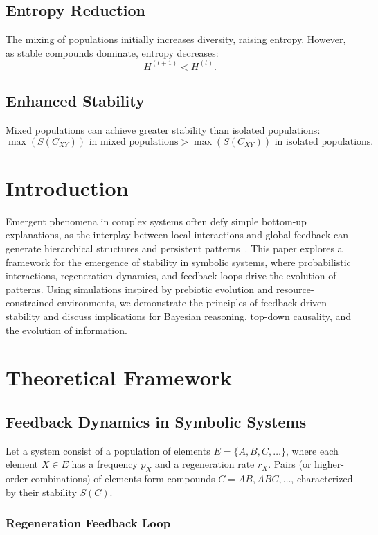 \documentclass[entropy,article,submit,pdftex,moreauthors]{Definitions/mdpi}
\begin{document}
\subsection*{Entropy Reduction}
The mixing of populations initially increases diversity, raising entropy. However, as stable compounds dominate, entropy decreases:
\[
H^{(t+1)} < H^{(t)}.
\]

\subsection*{Enhanced Stability}
Mixed populations can achieve greater stability than isolated populations:
\[
\max(S(C_{XY})) \text{ in mixed populations} > \max(S(C_{XY})) \text{ in isolated populations.}
\]

\section{Introduction}

Emergent phenomena in complex systems often defy simple bottom-up explanations, as the interplay between local interactions and global feedback can generate hierarchical structures and persistent patterns~\cite{anderson1972more}. This paper explores a framework for the emergence of stability in symbolic systems, where probabilistic interactions, regeneration dynamics, and feedback loops drive the evolution of patterns. Using simulations inspired by prebiotic evolution and resource-constrained environments, we demonstrate the principles of feedback-driven stability and discuss implications for Bayesian reasoning, top-down causality, and the evolution of information.

\section{Theoretical Framework}

\subsection{Feedback Dynamics in Symbolic Systems}

Let a system consist of a population of elements \( E = \{A, B, C, \ldots\} \), where each element \( X \in E \) has a frequency \( p_X \) and a regeneration rate \( r_X \). Pairs (or higher-order combinations) of elements form compounds \( C = AB, ABC, \ldots \), characterized by their stability \( S(C) \).

\subsubsection{Regeneration Feedback Loop}
\end{document}
